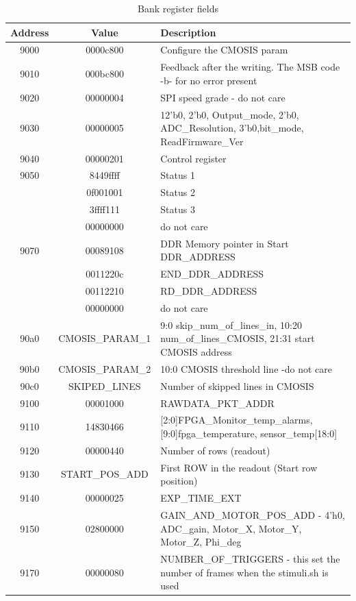 \begin{table}[p]
\begin{center}
\caption{\label{bank_reg_fields}Bank register fields}
\begin{tabular}{|c| c|p{10cm}|}
\hline
Address & Value & Description \\ 
\hline
9000 & 0000c800 & Configure the CMOSIS param\\
\hline
9010 & 000bc800 & Feedback after the writing. The MSB code -b- for no error present\\
\hline
9020 & 00000004 & SPI speed grade - do not care \\
\hline
9030 & 00000005	& 12'b0, 2'b0, Output\_mode, 2'b0, ADC\_Resolution, 3'b0,bit\_mode, ReadFirmware\_Ver \\
\hline
9040 & 00000201	& Control register\\
\hline
9050 & 8449ffff	& Status 1\\
	& 0f001001	& Status 2\\
	& 3ffff111	& Status 3\\
	& 00000000	& do not care\\
\hline
9070 & 00089108	& DDR Memory pointer in Start DDR\_ADDRESS\\
	& 0011220c	& END\_DDR\_ADDRESS\\
	& 00112210	& RD\_DDR\_ADDRESS\\
	& 00000000	& do not care\\
\hline
90a0 & CMOSIS\_PARAM\_1	& 9:0 skip\_num\_of\_lines\_in, 10:20 num\_of\_lines\_CMOSIS, 21:31 start CMOSIS address\\
\hline
90b0 & CMOSIS\_PARAM\_2	& 10:0 CMOSIS threshold line -do not care\\
\hline
90c0 & SKIPED\_LINES & Number of skipped lines in CMOSIS\\
\hline
9100 & 00001000 & RAWDATA\_PKT\_ADDR\\
\hline
9110 & 14830466 & [2:0]FPGA\_Monitor\_temp\_alarms, [9:0]fpga\_temperature, sensor\_temp[18:0]\\
\hline
9120 & 00000440 & Number of rows (readout)\\
\hline
9130 & START\_POS\_ADD & First ROW in the readout (Start row position)\\
\hline
9140 & 00000025 & EXP\_TIME\_EXT\\
\hline
9150 & 02800000 & GAIN\_AND\_MOTOR\_POS\_ADD - {4'h0, ADC\_gain, Motor\_X, Motor\_Y, Motor\_Z,	Phi\_deg} \\
\hline
9170 & 00000080 & NUMBER\_OF\_TRIGGERS - this set the number of frames when the stimuli.sh is used\\

\end{tabular}
\end{center}
\end{table}

